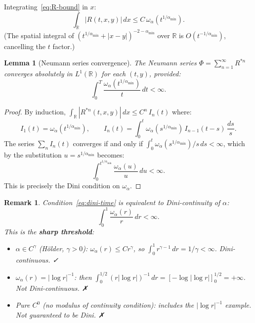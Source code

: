 \documentclass{amsart}
\newtheorem{lemma}[theorem]{Lemma}
\newtheorem{remark}[theorem]{Remark}
\theoremstyle{definition}
\begin{document}
Integrating~\eqref{eq:R-bound} in $x$:
\begin{equation}
    \int_{\mathbb{R}} |R(t,x,y)|\,dx
    \leq C\,\omega_\alpha(t^{1/\alpha_{\min}}).
    \label{eq:R-L1}
\end{equation}
(The spatial integral of $(t^{1/\alpha_{\min}}+|x-y|)^{-2-\alpha_{\min}}$
over $\mathbb{R}$ is $O(t^{-1/\alpha_{\min}})$, cancelling the $t$ factor.)

\begin{lemma}[Neumann series convergence]
\label{lem:neumann}
The Neumann series $\Phi = \sum_{n=1}^\infty R^{\ast n}$ converges absolutely in
$L^1(\mathbb{R})$ for each $(t,y)$, provided:
\begin{equation}
    \int_0^T \frac{\omega_\alpha(t^{1/\alpha_{\min}})}{t}\,dt < \infty.
    \label{eq:dini-time}
\end{equation}
\end{lemma}

\begin{proof}
By induction, $\int_\mathbb{R}|R^{\ast n}(t,x,y)|\,dx \leq C^n\,I_n(t)$ where:
\[
    I_1(t) = \omega_\alpha(t^{1/\alpha_{\min}}),
    \qquad
    I_n(t) = \int_0^t \omega_\alpha(s^{1/\alpha_{\min}})\,I_{n-1}(t-s)\,\frac{ds}{s}.
\]
The series $\sum_n I_n(t)$ converges if and only if $\int_0^t \omega_\alpha(s^{1/\alpha_{\min}})/s\,ds<\infty$,
which by the substitution $u=s^{1/\alpha_{\min}}$ becomes:
\[
    \int_0^{t^{1/\alpha_{\min}}} \frac{\omega_\alpha(u)}{u}\,du < \infty.
\]
This is precisely the Dini condition on $\omega_\alpha$.
\end{proof}

\begin{remark}
Condition~\eqref{eq:dini-time} is equivalent to Dini-continuity of $\alpha$:
\begin{equation}
    \int_0^1 \frac{\omega_\alpha(r)}{r}\,dr < \infty.
    \label{eq:dini}
\end{equation}
This is the \textbf{sharp threshold}:
\begin{itemize}
    \item $\alpha\in C^\gamma$ (Hölder, $\gamma>0$): $\omega_\alpha(r)\leq Cr^\gamma$,
          so $\int_0^1 r^{\gamma-1}\,dr=1/\gamma<\infty$. \emph{Dini-continuous.} ✓
    \item $\omega_\alpha(r) = |\log r|^{-1}$: then $\int_0^{1/2} (r|\log r|)^{-1}\,dr
          = [-\log|\log r|]_0^{1/2} = +\infty$. \emph{Not Dini-continuous.} ✗
    \item Pure $C^0$ (no modulus of continuity condition): includes the $|\log r|^{-1}$
          example. \emph{Not guaranteed to be Dini.} ✗
\end{itemize}
\end{remark}
\end{document}
